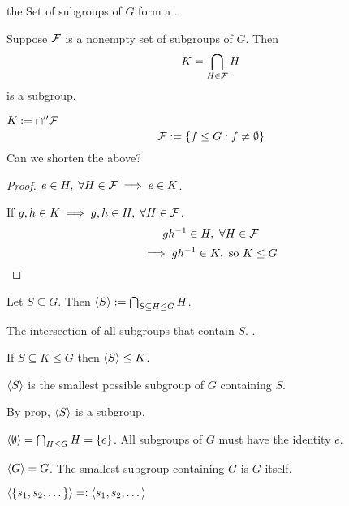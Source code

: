 \documentclass[12pt]{article}
\begin{document}
\bboxnote
{} the Set of subgroups of \(G\) form a .
\ebox

\bbox
\begin{prop}
  Suppose \(\mathcal F\) is a nonempty set of subgroups of \(G\). Then
  \[K=\bigcap_{H\in\mathcal F}H\]
  is a subgroup.
\end{prop}
\ebox
\bboxnota
\begin{nota}
  \(K:=\cap''\mathcal F\)
  \[\mathcal F:=\{f\le G:f\neq\emptyset\}\]
  Can we shorten the above?
\end{nota}
\ebox

\bboxproof
\begin{proof}[Proof]
  \(e\in H,\;\forall H\in\mathcal F\implies e\in K\).

  If \(g,h\in K\implies g,h\in H,\;\forall H\in\mathcal F\).
  \[gh^{-1}\in H,\ \forall H\in\mathcal F\]
  \[\implies g\inv h\in K,\ \T{so}\ K\le G\]
\end{proof}
\ebox

\bboxdefn
\begin{defn}[Generator]
  Let \(S\subseteq G\). Then \(\left\langle S\right\rangle:=\bigcap_{S\subseteq H\le G}H\).

  The intersection of all subgroups that contain \(S\).
  .

  If \(S\subseteq K\le G\) then \(\left\langle S\right\rangle\le K\).
\end{defn}
\ebox

\bboxnote
\begin{note}
  \(\left\langle S\right\rangle\) is the smallest possible subgroup of \(G\) containing \(S\).
  
  By prop, \(\left\langle S\right\rangle\) is a subgroup.
\end{note}
\ebox

\bboxexam
\begin{exam}
  \(\left\langle \emptyset\right\rangle=\bigcap_{H\le G}H=\{e\}\). All subgroups of \(G\) 
  must have the identity \(e\).
\end{exam}
\ebox

\bboxexam
\begin{exam}
  \(\left\langle G\right\rangle=G\). The smallest subgroup containing \(G\) is \(G\) itself.
\end{exam}
\ebox

\bboxnota
\begin{nota}
  \(\left\langle \{s_1,s_2,\dots\}\right\rangle=:\left\langle s_1,s_2,\dots\right\rangle\)
\end{nota}
\ebox
\end{document}
